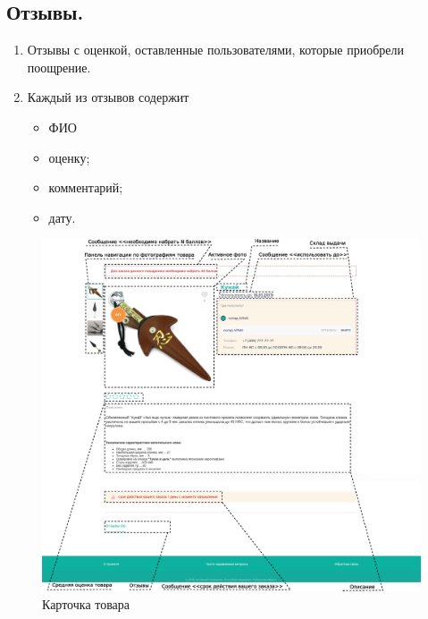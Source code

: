         \subsection{Отзывы.}\label{sec:noauth_otz}
            \begin{enumerate}
                \item Отзывы с оценкой, оставленные пользователями, которые 
                приобрели поощрение.
                \item Каждый из отзывов содержит
                    \begin{itemize}
                        \item ФИО
                        \item оценку;
                        \item комментарий;
                        \item дату.
                    \end{itemize}
            \end{enumerate}

        \begin{figure}
            \includegraphics[width=170mm]{02_noauth_funcs/figures/07.eps}
            \caption{Карточка товара}
            \label{fig:goods_cart}
        \end{figure} 


